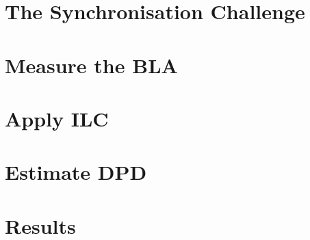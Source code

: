 %
%
\section{The Synchronisation Challenge}
\section{Measure the BLA}
\section{Apply ILC}
\section{Estimate DPD}
\section{Results}
